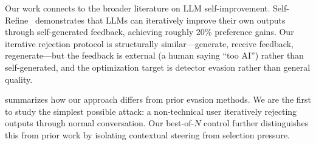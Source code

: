 Our work connects to the broader literature on LLM self-improvement.
Self-Refine~\cite{madaan2023selfrefine} demonstrates that LLMs can iteratively improve their own outputs through self-generated feedback, achieving roughly 20\% preference gains.
Our iterative rejection protocol is structurally similar---generate, receive feedback, regenerate---but the feedback is external (a human saying ``too AI'') rather than self-generated, and the optimization target is detector evasion rather than general quality.

 summarizes how our approach differs from prior evasion methods. We are the first to study the simplest possible attack: a non-technical user iteratively rejecting outputs through normal conversation. Our best-of-$N$ control further distinguishes this from prior work by isolating contextual steering from selection pressure.

\begin{table}[t]
\centering
\caption{Comparison of evasion methods. Our approach requires no technical expertise, custom decoding, or model access---only a standard chat interface. The best-of-$N$ control distinguishes steering from selection.}
\label{tab:positioning}
\small
{}
\end{table}
